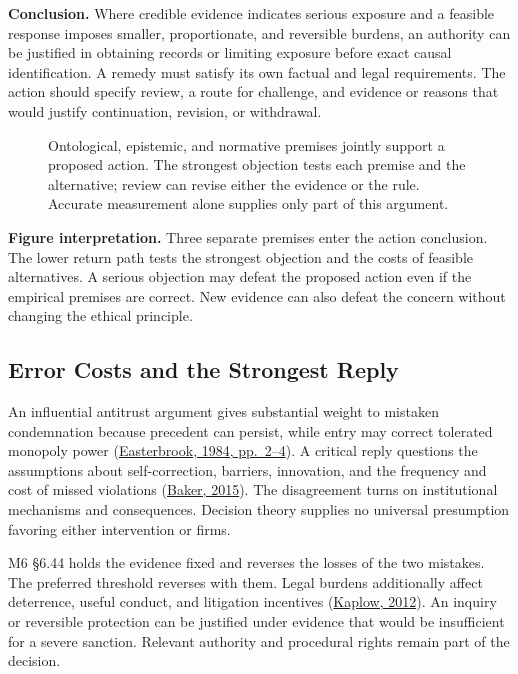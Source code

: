 \textbf{Conclusion.} Where credible evidence indicates serious exposure
and a feasible response imposes smaller, proportionate, and reversible
burdens, an authority can be justified in obtaining records or limiting
exposure before exact causal identification. A remedy must satisfy its
own factual and legal requirements. The action should specify review, a
route for challenge, and evidence or reasons that would justify
continuation, revision, or withdrawal.

\begin{figure}[htbp]
\centering

\caption{Ontological, epistemic, and normative premises jointly support a proposed action. The strongest objection tests each premise and the alternative; review can revise either the evidence or the rule. Accurate measurement alone supplies only part of this argument.}\label{fig:M09_reasons_under_uncertainty}
\end{figure}

\textbf{Figure interpretation.} Three separate premises enter the action
conclusion. The lower return path tests the strongest objection and the
costs of feasible alternatives. A serious objection may defeat the
proposed action even if the empirical premises are correct. New evidence
can also defeat the concern without changing the ethical principle.

\hypertarget{M09-error-costs-and-the-strongest-reply}{%
\subsection{Error Costs and the Strongest
Reply}\label{M09-error-costs-and-the-strongest-reply}}

\noindent An influential antitrust argument gives substantial weight to mistaken
condemnation because precedent can persist, while entry may correct
tolerated monopoly power
(\href{https://chicagounbound.uchicago.edu/journal_articles/1153/}{Easterbrook,
1984, pp.~2--4}). A critical reply questions the assumptions about
self-correction, barriers, innovation, and the frequency and cost of
missed violations
(\href{https://digitalcommons.wcl.american.edu/facsch_lawrev/1356/}{Baker,
2015}). The disagreement turns on institutional mechanisms and
consequences. Decision theory supplies no universal presumption favoring
either intervention or firms.

M6 §6.44 holds the evidence fixed and reverses the losses of the two
mistakes. The preferred threshold reverses with them. Legal burdens
additionally affect deterrence, useful conduct, and litigation
incentives
(\href{https://yalelawjournal.org/article/burden-of-proof}{Kaplow,
2012}). An inquiry or reversible protection can be justified under
evidence that would be insufficient for a severe sanction. Relevant
authority and procedural rights remain part of the decision.

